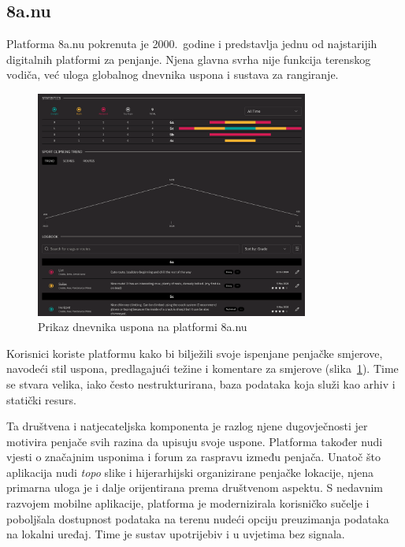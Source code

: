 \subsection{8a.nu}

Platforma 8a.nu pokrenuta je 2000.\ godine i predstavlja jednu od najstarijih digitalnih platformi za penjanje. Njena glavna svrha nije funkcija terenskog vodiča, već uloga globalnog dnevnika uspona i sustava za rangiranje. 

\begin{figure}[H]
    \centering
    \includegraphics[width=0.8\textwidth]{images/analiza/8anu_logbook.png}
    \caption{Prikaz dnevnika uspona na platformi 8a.nu}
    \label{fig:8anu_logbook}
\end{figure}

Korisnici koriste platformu kako bi bilježili svoje ispenjane penjačke smjerove, navodeći stil uspona, predlagajući težine i komentare za smjerove (slika~\ref{fig:8anu_logbook}). Time se stvara velika, iako često nestrukturirana, baza podataka koja služi kao arhiv i statički resurs.



Ta društvena i natjecateljska komponenta je razlog njene dugovječnosti jer motivira penjače svih razina da upisuju svoje uspone. Platforma također nudi vjesti o značajnim usponima i forum za raspravu između penjača. Unatoč što aplikacija nudi \textit{topo} slike i hijerarhijski organizirane penjačke lokacije, njena primarna uloga je i dalje orijentirana prema društvenom aspektu. 
S nedavnim razvojem mobilne aplikacije, platforma je modernizirala korisničko sučelje i poboljšala dostupnost podataka na terenu nudeći opciju preuzimanja podataka na lokalni uređaj. Time je sustav upotrijebiv i u uvjetima bez signala.


